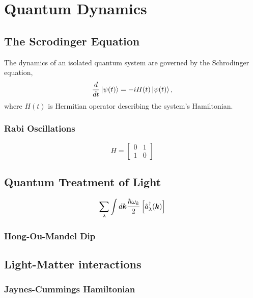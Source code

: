 \chapter{Quantum Dynamics} 
\label{ch:QuantumDynamics}

\section{The Scrodinger Equation}

The dynamics of an isolated quantum system are governed by the Schrodinger equation,
\begin{align}
  \frac{d}{dt}\left\vert\psi(t)\right\rangle = -i H(t) \left\vert\psi(t)\right\rangle,
\end{align}
where $H(t)$ is Hermitian operator describing the system's Hamiltonian.

\subsection{Rabi Oscillations}

\begin{equation}
H = 
\begin{bmatrix}
  0 & 1 \\
  1 & 0
\end{bmatrix}
\end{equation}



\section{Quantum Treatment of Light}

\begin{align}
  \sum_\lambda \int d{\boldsymbol{k}} \frac{\hbar\omega_k}{2} \left[ \hat{a}^\dagger_\lambda({\boldsymbol{k}}) \right]
\end{align}

\subsection{Hong-Ou-Mandel Dip}

\section{Light-Matter interactions}

\subsection{Jaynes-Cummings Hamiltonian}

